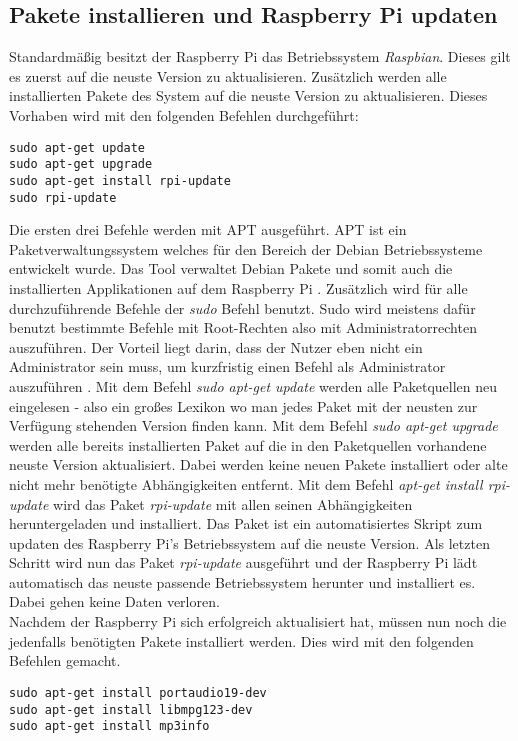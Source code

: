 \subsection{Pakete installieren und Raspberry Pi updaten}
Standardmäßig besitzt der Raspberry Pi das Betriebssystem \textit{Raspbian}. Dieses gilt es zuerst auf die neuste Version zu aktualisieren. Zusätzlich werden alle installierten Pakete des System auf die neuste Version zu aktualisieren. Dieses Vorhaben wird mit den folgenden Befehlen durchgeführt:
\begin{lstlisting}[caption={Aktualsierien des Raspberry Pi}]
sudo apt-get update 
sudo apt-get upgrade 
sudo apt-get install rpi-update 
sudo rpi-update
\end{lstlisting}
Die ersten drei Befehle werden mit \ac{APT} ausgeführt. \ac{APT} ist ein Paketverwaltungssystem welches für den Bereich der Debian Betriebssysteme entwickelt wurde. Das Tool verwaltet Debian Pakete und somit auch die installierten Applikationen auf dem Raspberry Pi \autocite{apt-debian-wiki_2019}.
Zusätzlich wird für alle durchzuführende Befehle der \textit{sudo} Befehl benutzt. \ac{Sudo} wird meistens dafür benutzt bestimmte Befehle mit Root-Rechten also mit Administratorrechten auszuführen. Der Vorteil liegt darin, dass der Nutzer eben nicht ein Administrator sein muss, um kurzfristig einen Befehl als Administrator auszuführen \autocite{moeller_2013}.
Mit dem Befehl \textit{sudo apt-get update} werden alle Paketquellen neu eingelesen - also ein großes Lexikon wo man jedes Paket mit der neusten zur Verfügung stehenden Version finden kann.
Mit dem Befehl \textit{sudo apt-get upgrade} werden alle bereits installierten Paket auf die in den Paketquellen vorhandene neuste Version aktualisiert. Dabei werden keine neuen Pakete installiert oder alte nicht mehr benötigte Abhängigkeiten entfernt. \autocite{apt-get-wiki_2019}
Mit dem Befehl \textit{apt-get install rpi-update} wird das Paket \textit{rpi-update} mit allen seinen Abhängigkeiten heruntergeladen und installiert. Das Paket ist ein automatisiertes Skript zum updaten des Raspberry Pi's Betriebssystem auf die neuste Version.
Als letzten Schritt wird nun das Paket \textit{rpi-update} ausgeführt und der Raspberry Pi lädt automatisch das neuste passende Betriebssystem herunter und installiert es. Dabei gehen keine Daten verloren.
\\
Nachdem der Raspberry Pi sich erfolgreich aktualisiert hat, müssen nun noch die jedenfalls benötigten Pakete installiert werden. Dies wird mit den folgenden Befehlen gemacht.
\begin{lstlisting}[caption={Installation benötigter Pakete}]
sudo apt-get install portaudio19-dev
sudo apt-get install libmpg123-dev
sudo apt-get install mp3info 
\end{lstlisting}

